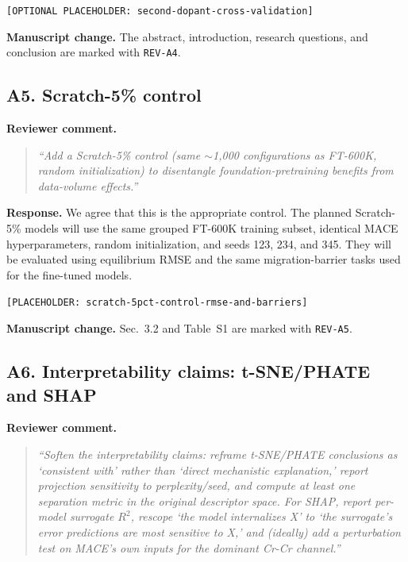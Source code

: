 \documentclass[11pt,a4paper]{article}
\begin{document}
\begin{center}
\texttt{[OPTIONAL PLACEHOLDER: second-dopant-cross-validation]}
\end{center}

\noindent\textbf{Manuscript change.}
The abstract, introduction, research questions, and conclusion are marked with \texttt{REV-A4}.

\subsection*{A5. Scratch-5\% control}

\noindent\textbf{Reviewer comment.}
\begin{quote}
\itshape
``Add a Scratch-5\% control (same $\sim$1,000 configurations as FT-600K, random initialization) to disentangle foundation-pretraining benefits from data-volume effects.''
\end{quote}

\noindent\textbf{Response.}
We agree that this is the appropriate control. The planned Scratch-5\% models will use the same grouped FT-600K training subset, identical MACE hyperparameters, random initialization, and seeds 123, 234, and 345. They will be evaluated using equilibrium RMSE and the same migration-barrier tasks used for the fine-tuned models.

\begin{center}
\texttt{[PLACEHOLDER: scratch-5pct-control-rmse-and-barriers]}
\end{center}

\noindent\textbf{Manuscript change.}
Sec.~3.2 and Table~S1 are marked with \texttt{REV-A5}.

\subsection*{A6. Interpretability claims: t-SNE/PHATE and SHAP}

\noindent\textbf{Reviewer comment.}
\begin{quote}
\itshape
``Soften the interpretability claims: reframe t-SNE/PHATE conclusions as `consistent with' rather than `direct mechanistic explanation,' report projection sensitivity to perplexity/seed, and compute at least one separation metric in the original descriptor space. For SHAP, report per-model surrogate $R^2$, rescope `the model internalizes X' to `the surrogate's error predictions are most sensitive to X,' and (ideally) add a perturbation test on MACE's own inputs for the dominant Cr-Cr channel.''
\end{quote}
\end{document}

